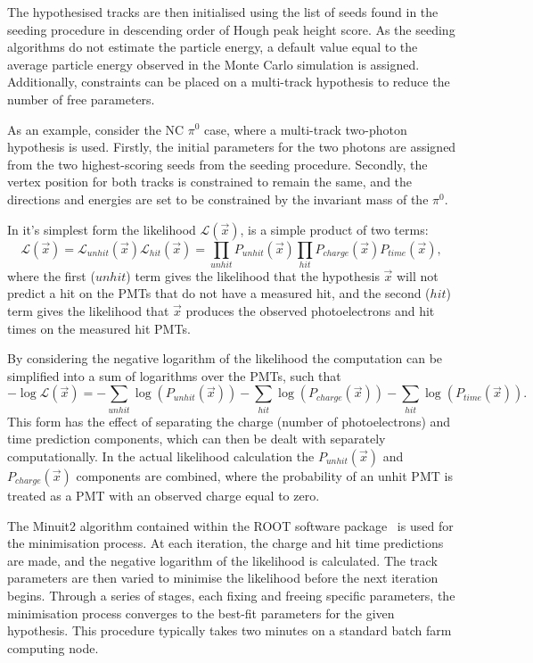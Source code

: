 The hypothesised tracks are then initialised using the list of seeds found in the seeding
procedure in descending order of Hough peak height score. As the seeding algorithms do not
estimate the particle energy, a default value equal to the average particle energy observed in the
Monte Carlo simulation is assigned. Additionally, constraints can be placed on a multi-track
hypothesis to reduce the number of free parameters.

As an example, consider the NC $\pi^{0}$ case, where a multi-track two-photon hypothesis is used.
Firstly, the initial parameters for the two photons are assigned from the two highest-scoring
seeds from the seeding procedure. Secondly, the vertex position for both tracks is constrained to
remain the same, and the directions and energies are set to be constrained by the invariant mass
of the $\pi^{0}$.

In it's simplest form the likelihood $\mathcal{L}(\vec{x})$, is a simple product of two terms:
\begin{equation} %
    \mathcal{L}(\vec{x})=\mathcal{L}_{unhit}(\vec{x})\mathcal{L}_{hit}(\vec{x})=
    \prod_{unhit}P_{unhit}(\vec{x})\prod_{hit}P_{charge}(\vec{x})P_{time}(\vec{x}),
    \label{eq:likelihood}
\end{equation}
where the first ($unhit$) term gives the likelihood that the hypothesis $\vec{x}$ will not predict
a hit on the PMTs that do not have a measured hit, and the second ($hit$) term gives the
likelihood that $\vec{x}$ produces the observed photoelectrons and hit times on the measured hit
PMTs. 

By considering the negative logarithm of the likelihood the computation can be simplified into a
sum of logarithms over the PMTs, such that
\begin{equation} %
    -\log\mathcal{L}(\vec{x})=
    -\sum_{unhit}\log(P_{unhit}(\vec{x}))
    -\sum_{hit}\log(P_{charge}(\vec{x}))
    -\sum_{hit}\log(P_{time}(\vec{x})).
    \label{eq:likelihood_sum}
\end{equation}
This form has the effect of separating the charge (number of photoelectrons) and time prediction
components, which can then be dealt with separately computationally. In the actual likelihood
calculation the $P_{unhit}(\vec{x})$ and $P_{charge}(\vec{x})$ components are combined, where the
probability of an unhit PMT is treated as a PMT with an observed charge equal to zero.

The Minuit2 algorithm contained within the ROOT software package~\cite{brun1997} is used for the
minimisation process. At each iteration, the charge and hit time predictions are made, and the
negative logarithm of the likelihood is calculated. The track parameters are then varied to
minimise the likelihood before the next iteration begins. Through a series of stages, each fixing
and freeing specific parameters, the minimisation process converges to the best-fit parameters for
the given hypothesis. This procedure typically takes two minutes on a standard batch farm
computing node.

